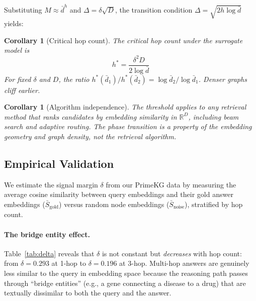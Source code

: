 \documentclass[11pt]{article}
\newtheorem{corollary}[theorem]{Corollary}
\begin{document}
Substituting $M \approx \bar{d}^h$ and $\Delta = \delta\sqrt{D}$, the transition condition $\Delta = \sqrt{2h \log \bar{d}}$ yields:

\begin{corollary}[Critical hop count]\label{cor:hstar}
The critical hop count under the surrogate model is
\begin{equation}\label{eq:hstar}
\boxed{\; h^* = \frac{\delta^2 D}{2 \log \bar{d}} \;}
\end{equation}
For fixed $\delta$ and $D$, the ratio $h^*(\bar{d}_1) / h^*(\bar{d}_2) = \log \bar{d}_2 / \log \bar{d}_1$. Denser graphs cliff earlier.
\end{corollary}

\begin{corollary}[Algorithm independence]\label{cor:alg}
The threshold applies to \emph{any} retrieval method that ranks candidates by embedding similarity in $\mathbb{R}^D$, including beam search and adaptive routing. The phase transition is a property of the embedding geometry and graph density, not the retrieval algorithm.
\end{corollary}

\subsection{Empirical Validation}

We estimate the signal margin $\delta$ from our PrimeKG data by measuring the average cosine similarity between query embeddings and their gold answer embeddings ($\bar{S}_{\text{gold}}$) versus random node embeddings ($\bar{S}_{\text{noise}}$), stratified by hop count.

\paragraph{The bridge entity effect.} Table~\ref{tab:delta} reveals that $\delta$ is not constant but \textit{decreases} with hop count: from $\delta = 0.293$ at 1-hop to $\delta = 0.196$ at 3-hop. Multi-hop answers are genuinely less similar to the query in embedding space because the reasoning path passes through ``bridge entities'' (e.g., a gene connecting a disease to a drug) that are textually dissimilar to both the query and the answer.
\end{document}

